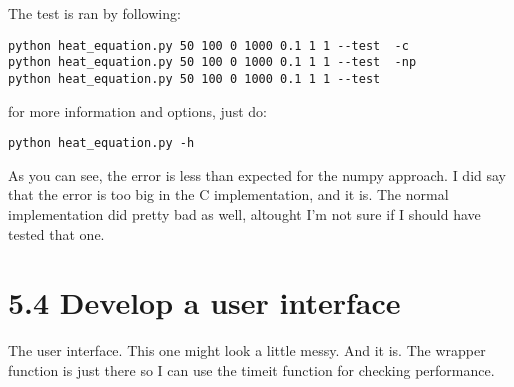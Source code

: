 \documentclass[a4paper]{article}
\begin{document}
The test is ran by following:
\begin{verbatim}
python heat_equation.py 50 100 0 1000 0.1 1 1 --test  -c
python heat_equation.py 50 100 0 1000 0.1 1 1 --test  -np
python heat_equation.py 50 100 0 1000 0.1 1 1 --test 
\end{verbatim}
for more information and options, just do:
\begin{verbatim}
python heat_equation.py -h
\end{verbatim}
As you can see, the error is less than expected for the numpy approach. I did say that the error is too big in the C implementation, and it is. The normal implementation did pretty bad as well, altought I'm not sure if I should have tested that one.

\section*{5.4 Develop a user interface}
The user interface. This one might look a little messy. And it is. 
The wrapper function is just there so I can use the timeit function for checking performance.
\end{document}
